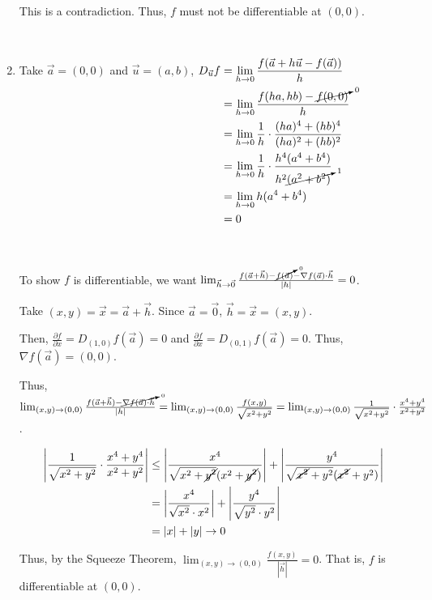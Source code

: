 \documentclass[11pt,fleqn]{book} %
\begin{document}
\begin{enumerate}[label=\alph*)]
    This is a contradiction. Thus, $f$ must not be differentiable at $(0,0)$. 

    {~~~}

    \item Take $\vec{a} = (0,0)$ and $\vec{u} = (a,b)$,
    $\begin{aligned}[t]
        D_{\vec{u}} f
         & = \lim_{h\to0} \frac{f(\vec{a} + h\vec{u} - f(\vec{a}))}{h}                          \\
         & = \lim_{h\to0} \frac{f(ha, hb) - \cancelto{0}{f(0,0)}}{h}                            \\
         & = \lim_{h\to0} \frac{1}{h} \cdot \frac{(ha)^4 + (hb)^4}{(ha)^2 + (hb)^2}             \\
         & = \lim_{h\to0} \frac{1}{h} \cdot \frac{h^4(a^4 + b^4)}{h^2\cancelto{1}{(a^2 + b^2)}} \\
         & = \lim_{h\to0} h(a^4 + b^4)                                                          \\
         & = 0
    \end{aligned}$

    {~~~}

    To show $f$ is differentiable, we want $\lim_{\vec{h}\to\vec{0}} \frac{f(\vec{a} + \vec{h}) - \cancelto{0}{f(\vec{a})} - \nabla f(\vec{a}) \cdot \vec{h}}{|h|} = 0$. 

    Take $(x, y) = \vec{x} = \vec{a} + \vec{h}$. Since $\vec{a} = \vec{0}$, $\vec{h} = \vec{x} = (x, y)$.

    Then, $\frac{\partial f}{\partial x} = D_{(1,0)} f(\vec{a}) = 0$ and $\frac{\partial f}{\partial x} = D_{(0,1)} f(\vec{a}) = 0$. Thus, $\nabla f(\vec{a}) = (0,0)$. 

    Thus, $\lim_{(x,y)\to(0,0)} \frac{f(\vec{a} + \vec{h}) - \cancelto{0}{\nabla f(\vec{a}) \cdot \vec{h}}}{|h|} = \lim_{(x,y)\to(0,0)} \frac{f(x,y)}{\sqrt{x^2+y^2}} = \lim_{(x,y)\to(0,0)}\frac{1}{\sqrt{x^2 + y^2}} \cdot \frac{x^4 + y^4}{x^2 + y^2}$.

    \vfill\newpage

    \begin{align*}
        \left| \frac{1}{\sqrt{x^2+y^2}} \cdot \frac{x^4 + y^4}{x^2 + y^2} \right|
         & \le \left| \frac{x^4}{\sqrt{x^2 + \cancel{y^2}}(x^2 + \cancel{y^2})} \right| + \left| \frac{y^4}{\sqrt{\cancel{x^2} + y^2} (\cancel{x^2} + y^2)} \right| \\
         & =   \left| \frac{x^4}{\sqrt{x^2} \cdot x^2} \right| + \left| \frac{y^4}{\sqrt{y^2}\cdot y^2} \right| \\
         & =   | x | + | y | \to 0
    \end{align*}

    Thus, by the Squeeze Theorem, $\lim_{(x,y)\to(0,0)} \frac{f(x,y)}{|\vec{h}|} = 0$. That is, $f$ is differentiable at $(0,0)$.
\end{enumerate}
\end{document}
